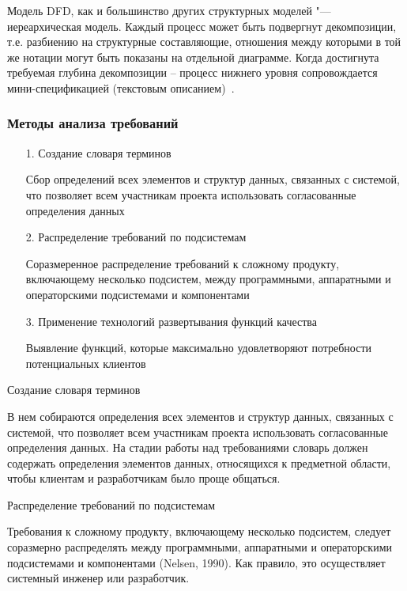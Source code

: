 \documentclass{../industrial-development}
\begin{document}
Модель DFD, как и большинство других структурных моделей "--- иереархическая модель. Каждый процесс может быть подвергнут декомпозиции, т.е. разбиению на структурные составляющие, отношения между которыми в той же нотации могут быть показаны на отдельной диаграмме. Когда достигнута требуемая глубина декомпозиции – процесс нижнего уровня сопровождается мини-спецификацией (текстовым описанием)~\cite[с.~48--49]{Maglinec}.


\begin{frame} \frametitle{Методы анализа требований}
\begin{itemize}
\item[1.] Создание словаря терминов

{\small Сбор определений всех элементов и структур данных, связанных с системой, что позволяет всем участникам проекта использовать согласованные определения данных}

\item[2.] Распределение требований по подсистемам

{\small Соразмеренное распределение требований к сложному продукту, включающему несколько подсистем, между программными, аппаратными и операторскими подсистемами и компонентами}

\item[3.] Применение технологий развертывания функций качества

{\small Выявление функций, которые максимально удовлетворяют потребности потенциальных клиентов}

\end{itemize}
\end{frame}

\lecturenotes

\alert{Создание словаря терминов}

В нем собираются определения всех элементов и структур данных, связанных с системой, что позволяет всем участникам проекта использовать согласованные определения данных. На стадии работы над требованиями словарь должен содержать определения элементов данных, относящихся к предметной области, чтобы клиентам и разработчикам было проще общаться.

\alert{Распределение требований по подсистемам}

Требования к сложному продукту, включающему несколько подсистем, следует соразмерно распределять между программными, аппаратными и операторскими подсистемами и компонентами (Nelsen, 1990). Как правило, это осуществляет системный инженер или разработчик.
\end{document}
